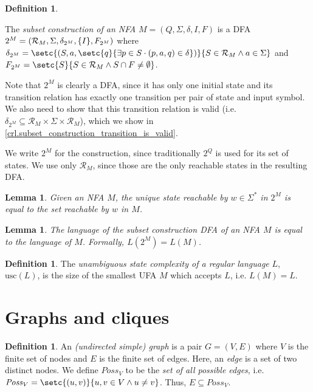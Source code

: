 \documentclass{report}
\DeclarePairedDelimiter{\set}{\{}{\}}
\newtheorem{lemma}[theorem]{Lemma}
\theoremstyle{definition}
\newtheorem{definition}[theorem]{Definition}
\begin{document}
\begin{definition} \label{def.subset_construction}
\begin{sloppypar}
The \emph{subset construction of an NFA} $M = (Q, \Sigma, \delta, I, F)$ is
a DFA ${2^M = (\mathcal{R}_M, \Sigma, \delta_{2^M}, \set{I}, F_{2^M})}$ where
$\delta_{2^M} = \setc{(S, a, \setc{q}{\exists p \in S \cdot (p, a, q) \in \delta})}
{S \in \mathcal{R}_M \wedge a \in \Sigma}$ and
$F_{2^M} = \setc{S}{S \in \mathcal{R}_M \wedge S \cap F \neq \emptyset}$.
\end{sloppypar}

Note that $2^M$ is clearly a DFA, since it has only one initial state and its
transition relation has exactly one transition per pair of state and input symbol.
We also need to show that this transition relation is valid
(i.e. $\delta_{2^M} \subseteq \mathcal{R}_M \times \Sigma \times \mathcal{R}_M$),
which we show in \cref{crl.subset_construction_transition_is_valid}.

We write $2^M$ for the construction, since traditionally $2^Q$ is used for its
set of states. We use only $\mathcal{R}_M$, since those are the only reachable
states in the resulting DFA.
\end{definition}

\begin{lemma} \label{lma.subset_construction_reachable_states}
Given an NFA $M$, the unique state reachable by $w \in \Sigma^{\ast}$ in $2^M$
is equal to the set reachable by $w$ in $M$.
\end{lemma}

\begin{lemma} \label{lma.of_subset_is_identity}
The language of the subset construction DFA of an NFA $M$ is equal to the
language of $M$. Formally, $L(2^M) = L(M)$.
\end{lemma}

\begin{definition} \label{def.usc}
The \emph{unambiguous state complexity of a regular language} $L$,
$\mathrm{usc}(L)$, is the size of the smallest UFA $M$ which accepts $L$, i.e.
$L(M) = L$.
\end{definition}

\section{Graphs and cliques}

\begin{definition} \label{def.graph}
An \emph{(undirected simple) graph} is a pair $G = (V, E)$ where $V$ is the finite
set of nodes and $E$ is the finite set of edges. Here, an \emph{edge} is a set of
two distinct nodes. We define $\mathit{Poss}_V$ to be the \emph{set of all possible edges},
i.e. $\mathit{Poss}_V = \setc{(u, v)}{u, v \in V \wedge u \neq v}$. Thus,
$E \subseteq \mathit{Poss}_V$.
\end{definition}
\end{document}
